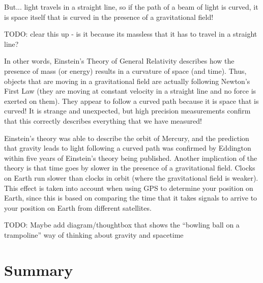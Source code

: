But... light travels in a straight line, so if the path of a beam of light is curved, it is space itself that is curved in the presence of a gravitational field! 

TODO: clear this up - is it because its massless that it has to travel in a straight line?

In other words, Einstein's Theory of General Relativity describes how the presence of mass (or energy) results in a curvature of space (and time). Thus, objects that are moving in a gravitational field are actually following Newton's First Law (they are moving at constant velocity in a straight line and no force is exerted on them). They appear to follow a curved path because it is space that is curved! It is strange and unexpected, but high precision measurements confirm that this correctly describes everything that we have measured!

Einstein's theory was able to describe the orbit of Mercury, and the prediction that gravity leads to light following a curved path was confirmed by Eddington within five years of Einstein's theory being published. Another implication of the theory is that time goes by slower in the presence of a gravitational field. Clocks on Earth run slower than clocks in orbit (where the gravitational field is weaker). This effect is taken into account when using GPS to determine your position on Earth, since this is based on comparing the time that it takes signals to arrive to your position on Earth from different satellites.


TODO: Maybe add diagram/thoughtbox that shows the ``bowling ball on a trampoline'' way of thinking about gravity and spacetime

\newpage
\section{Summary}

